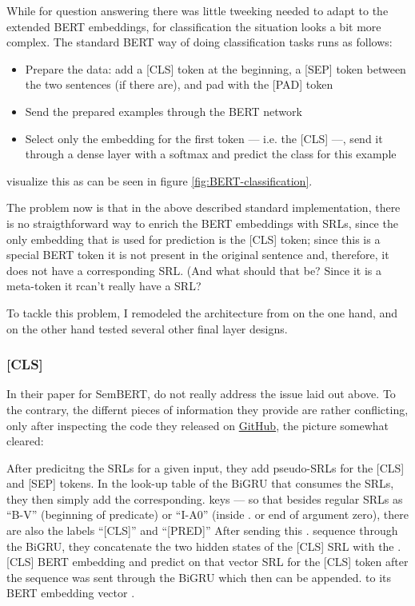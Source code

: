 While for question answering there was little tweeking needed to adapt to the extended BERT
embeddings, for classification the situation looks a bit more complex. The standard BERT way
of doing classification tasks runs as follows:

\begin{itemize}
  \item Prepare the data: add a [CLS] token at the beginning, a [SEP] token between the two sentences (if there are), and pad with the [PAD] token
  \item Send the prepared examples through the BERT network
  \item Select only the embedding for the first token  --- i.e. the [CLS] ---, send it through a dense layer with a softmax and predict the class for this example
\end{itemize}

\cite{devlin2018bert} visualize this as can be seen in figure \ref{fig:BERT-classification}.



The problem now is that in the above described standard implementation, there
is no straigthforward way to enrich the BERT embeddings with SRLs, since the
only embedding that is used for prediction is the [CLS] token; since this is a
special BERT token it is not present in the original sentence and, therefore,
it does not have a corresponding SRL. (And what should that be? Since it is a
meta-token it rcan't really have a SRL?

To tackle this problem, I remodeled the architecture from \cite{zhang2019semantics} on the one
hand, and on the other hand tested several other final layer designs.

\subsubsection{[CLS]}

In their paper for SemBERT, \cite{zhang2019semantics} do not really address the
issue laid out above. To the contrary, the differnt pieces of information they
provide are rather conflicting, only after inspecting the code they released on
\href{https://github.com/cooelf/SemBERT/}{GitHub}, the picture somewhat cleared:

After predicitng the SRLs for a given input, they add pseudo-SRLs for the [CLS] and [SEP] tokens.
In the look-up table of the BiGRU that consumes the SRLs, they then simply add the corresponding.
keys --- so that besides regular SRLs as ``B-V'' (beginning of predicate) or ``I-A0'' (inside   .
or end of argument zero), there are also the labels ``[CLS]'' and ``[PRED]'' After sending this .
sequence through the BiGRU, they concatenate the two hidden states of the [CLS] SRL with the    .
[CLS] BERT embedding and predict on that vector %
SRL for the [CLS] token after the sequence was sent through the BiGRU which then can be appended.
to its BERT embedding vector                                                                    .

